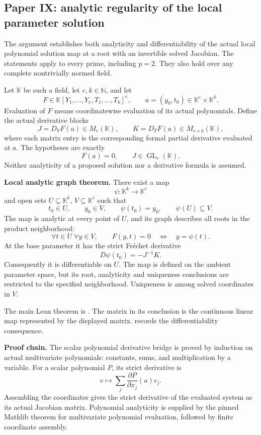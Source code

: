 \hypertarget{cont11:paper-ix-analytic-regularity-of-the-local-parameter-solution}{%
\subsection{Paper IX: analytic regularity of the local parameter
solution}\label{cont11:paper-ix-analytic-regularity-of-the-local-parameter-solution}}

The argument establishes both analyticity and differentiability of the
actual local polynomial solution map at a root with an invertible solved
Jacobian. The statements apply to every prime, including \(p=2\). They
also hold over any complete nontrivially normed field.

Let \(\mathbb K\) be such a field, let \(e,k\in\mathbb N\), and let \[
F\in\mathbb K[Y_1,\ldots,Y_e,T_1,\ldots,T_k]^e,
\qquad a=(y_0,t_0)\in\mathbb K^e\times\mathbb K^k.
\] Evaluation of \(F\) means coordinatewise evaluation of its actual
polynomials. Define the actual derivative blocks \[
J=D_YF(a)\in M_e(\mathbb K),
\qquad K=D_TF(a)\in M_{e\times k}(\mathbb K),
\] where each matrix entry is the corresponding formal partial
derivative evaluated at \(a\). The hypotheses are exactly \[
F(a)=0,
\qquad J\in\operatorname{GL}_e(\mathbb K).
\] Neither analyticity of a proposed solution nor a derivative formula
is assumed.

\textbf{Local analytic graph theorem.} There exist a map \[
\psi:\mathbb K^k\longrightarrow\mathbb K^e
\] and open sets \(U\subseteq\mathbb K^k\), \(V\subseteq\mathbb K^e\)
such that \[
t_0\in U,\qquad y_0\in V,\qquad \psi(t_0)=y_0,
\qquad \psi(U)\subseteq V.
\] The map is analytic at every point of \(U\), and its graph describes
all roots in the product neighborhood: \[
\forall t\in U\;\forall y\in V,
\qquad F(y,t)=0\quad\Longleftrightarrow\quad y=\psi(t).
\] At the base parameter it has the strict Fréchet derivative \[
\boxed{D\psi(t_0)=-J^{-1}K.}
\] Consequently it is differentiable on \(U\). The map is defined on the
ambient parameter space, but its root, analyticity and uniqueness
conclusions are restricted to the specified neighborhood. Uniqueness is
among solved coordinates in \(V\).

The main Lean theorem is
.
The matrix in its  conclusion is the
continuous linear map represented by the displayed matrix.
 records the
differentiability consequence.

\textbf{Proof chain.} The scalar polynomial derivative bridge is proved
by induction on actual multivariate polynomials: constants, sums, and
multiplication by a variable. For a scalar polynomial \(P\), its strict
derivative is \[
v\longmapsto\sum_j \frac{\partial P}{\partial x_j}(a)v_j.
\] Assembling the coordinates gives the strict derivative of the
evaluated system as its actual Jacobian matrix. Polynomial analyticity
is supplied by the pinned Mathlib theorem for multivariate polynomial
evaluation, followed by finite coordinate assembly.

